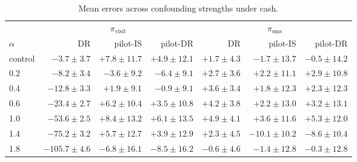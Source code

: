 \begin{table}[!htbp]
\centering
\caption{Mean errors across confounding strengths under cash.}
\label{tab:frontier_cash}
\footnotesize
\begin{adjustbox}{max width=\linewidth}
\begin{tabular}{lrrrrrr}
\toprule
& \multicolumn{3}{c}{$\pi_{\mathrm{visit}}$} & \multicolumn{3}{c}{$\pi_{\mathrm{sms}}$} \\
\cmidrule(lr){2-4}\cmidrule(lr){5-7}
$\alpha$ & DR & pilot-IS & pilot-DR & DR & pilot-IS & pilot-DR \\
\midrule
control & $-3.7 \pm 3.7$ & $+7.8 \pm 11.7$ & $+4.9 \pm 12.1$ & $+1.7 \pm 4.3$ & $-1.7 \pm 13.7$ & $-0.5 \pm 14.2$ \\
0.2 & $-8.2 \pm 3.4$ & $-3.6 \pm 9.2$ & $-6.4 \pm 9.1$ & $+2.7 \pm 3.6$ & $+2.2 \pm 11.1$ & $+2.9 \pm 10.8$ \\
0.4 & $-12.8 \pm 3.3$ & $+1.9 \pm 9.1$ & $-0.9 \pm 9.1$ & $+3.6 \pm 3.4$ & $+1.8 \pm 12.3$ & $+2.3 \pm 12.3$ \\
0.6 & $-23.4 \pm 2.7$ & $+6.2 \pm 10.4$ & $+3.5 \pm 10.8$ & $+4.2 \pm 3.8$ & $+2.2 \pm 13.0$ & $+3.2 \pm 13.1$ \\
1.0 & $-53.6 \pm 2.5$ & $+8.4 \pm 13.2$ & $+6.1 \pm 13.5$ & $+4.9 \pm 4.1$ & $+3.6 \pm 11.6$ & $+5.3 \pm 12.0$ \\
1.4 & $-75.2 \pm 3.2$ & $+5.7 \pm 12.7$ & $+3.9 \pm 12.9$ & $+2.3 \pm 4.5$ & $-10.1 \pm 10.2$ & $-8.6 \pm 10.4$ \\
1.8 & $-105.7 \pm 4.6$ & $-6.8 \pm 16.1$ & $-8.5 \pm 16.2$ & $-0.6 \pm 4.6$ & $-1.4 \pm 12.8$ & $-0.3 \pm 12.8$ \\
\bottomrule
\end{tabular}
\end{adjustbox}
\end{table}
